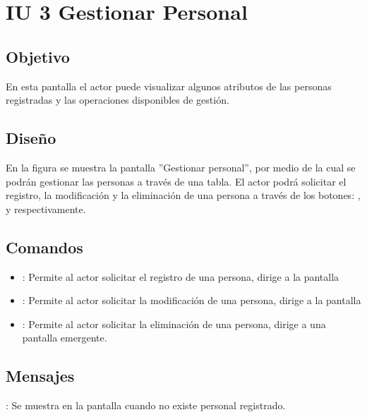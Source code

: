 \section{IU 3 Gestionar Personal}

\subsection{Objetivo}
	En esta pantalla el actor puede visualizar algunos atributos de las personas registradas y las operaciones disponibles de gestión.
\subsection{Diseño}
	En la figura  se muestra la pantalla ''Gestionar personal'', por medio de la cual se podrán gestionar las personas a través de una tabla. El actor podrá solicitar el registro, la modificación y la eliminación de una persona a través de los botones: , \editar y \eliminar respectivamente.

\subsection{Comandos}
\begin{itemize}
	\item {}: Permite al actor solicitar el registro de una persona, dirige a la pantalla 
	\item \editar [Modificar]: Permite al actor solicitar la modificación de una persona, dirige a la pantalla 
	\item \eliminar [Eliminar]: Permite al actor solicitar la eliminación de una persona, dirige a una pantalla emergente.
\end{itemize}

\subsection{Mensajes}

\begin{Citemize}
	\item {}: Se muestra en la pantalla  cuando no existe personal registrado.
\end{Citemize}
